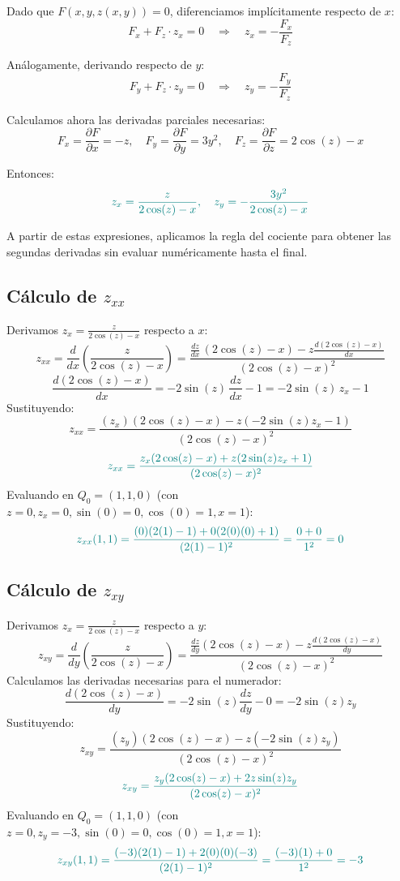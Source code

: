 \documentclass{article}
\begin{document}
Dado que \( F(x,y,z(x,y)) = 0 \), diferenciamos implícitamente respecto de \( x \):
\[
F_x + F_z \cdot z_x = 0 \quad \Rightarrow \quad z_x = -\frac{F_x}{F_z}
\]

Análogamente, derivando respecto de \( y \):
\[
F_y + F_z \cdot z_y = 0 \quad \Rightarrow \quad z_y = -\frac{F_y}{F_z}
\]

Calculamos ahora las derivadas parciales necesarias:
\[
F_x = \frac{\partial F}{\partial x} = -z, \quad
F_y = \frac{\partial F}{\partial y} = 3y^2, \quad
F_z = \frac{\partial F}{\partial z} = 2\cos(z) - x
\]

Entonces:
\[
\color{teal}
z_x = \frac{z}{2\cos(z) - x}, \quad
z_y = -\frac{3y^2}{2\cos(z) - x}
\]

A partir de estas expresiones, aplicamos la regla del cociente para obtener las segundas derivadas sin evaluar numéricamente hasta el final.

\subsection*{Cálculo de \( z_{xx} \)}


Derivamos \( z_x = \frac{z}{2\cos(z) - x} \) respecto a \( x \):
\[ z_{xx} = \frac{d}{dx}\left(\frac{z}{2\cos(z) - x}\right) = \frac{\frac{dz}{dx}\,(2\cos(z) - x) - z \frac{d(2\cos(z) - x)}{dx}}{(2\cos(z) - x)^2} \]
\[ \frac{d(2\cos(z) - x)}{dx} = -2\sin(z)\,\frac{dz}{dx} - 1 = -2\sin(z)\,z_x - 1 \]
Sustituyendo:
\[ z_{xx} = \frac{(z_x)(2\cos(z) - x) - z(-2\sin(z) z_x - 1)}{(2\cos(z) - x)^2} \]
\[ \color{teal}z_{xx} = \frac{z_x(2\cos(z) - x) + z(2\sin(z) z_x + 1)}{(2\cos(z) - x)^2} \]
Evaluando en \( Q_0 = (1,1,0) \) (con \( z=0, z_x=0, \sin(0)=0, \cos(0)=1, x=1 \)):
\[ \color{teal} z_{xx}(1,1) = \frac{(0)(2(1) - 1) + 0(2(0)(0) + 1)}{(2(1) - 1)^2} = \frac{0 + 0}{1^2} = 0 \]


\subsection*{Cálculo de \( z_{xy} \)}
Derivamos \( z_x = \frac{z}{2\cos(z) - x} \) respecto a \( y \):
\[ z_{xy} = \frac{d}{dy}\left(\frac{z}{2\cos(z) - x}\right) = \frac{\frac{dz}{dy} (2\cos(z) - x) - z \frac{d(2\cos(z) - x)}{dy}}{(2\cos(z) - x)^2} \]
Calculamos las derivadas necesarias para el numerador:
\[ \frac{d(2\cos(z) - x)}{dy} = -2\sin(z) \frac{dz}{dy} - 0 = -2\sin(z) z_y \]
Sustituyendo:
\[ z_{xy} = \frac{(z_y)(2\cos(z) - x) - z(-2\sin(z) z_y)}{(2\cos(z) - x)^2} \]
\[\color{teal} z_{xy} = \frac{z_y(2\cos(z) - x) + 2z \sin(z) z_y}{(2\cos(z) - x)^2} \]
Evaluando en \( Q_0 = (1,1,0) \) (con \( z=0, z_y=-3, \sin(0)=0, \cos(0)=1, x=1 \)):
\[\color{teal} z_{xy}(1,1) = \frac{(-3)(2(1) - 1) + 2(0)(0)(-3)}{(2(1) - 1)^2} = \frac{(-3)(1) + 0}{1^2} = -3 \]
\end{document}
